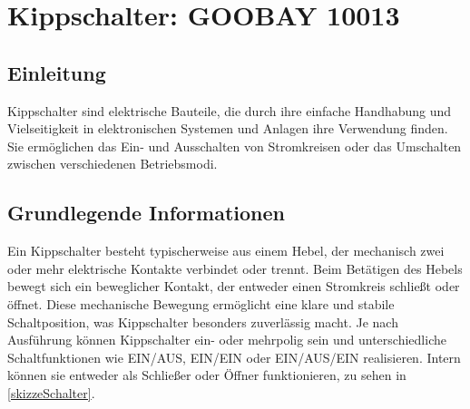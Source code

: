 %
%
%


\chapter{Kippschalter: GOOBAY 10013}\label{Schalter}
\section{Einleitung}
Kippschalter sind elektrische Bauteile, die durch ihre einfache Handhabung und Vielseitigkeit in elektronischen Systemen und Anlagen ihre Verwendung finden. Sie ermöglichen das Ein- und Ausschalten von Stromkreisen oder das Umschalten zwischen verschiedenen Betriebsmodi. 
\cite{NKKswitches:2025} \cite{Indicatorlight:2025}

\section{Grundlegende Informationen}
Ein Kippschalter besteht typischerweise aus einem Hebel, der mechanisch zwei oder mehr elektrische Kontakte verbindet oder trennt. Beim Betätigen des Hebels bewegt sich ein beweglicher Kontakt, der entweder einen Stromkreis schließt oder öffnet. Diese mechanische Bewegung ermöglicht eine klare und stabile Schaltposition, was Kippschalter besonders zuverlässig macht. Je nach Ausführung können Kippschalter ein- oder mehrpolig sein und unterschiedliche Schaltfunktionen wie EIN/AUS, EIN/EIN oder EIN/AUS/EIN realisieren. Intern können sie entweder als Schließer oder Öffner funktionieren, zu sehen in \ref{skizzeSchalter}.\cite{NKKswitches:2025} \cite{Indicatorlight:2025}

